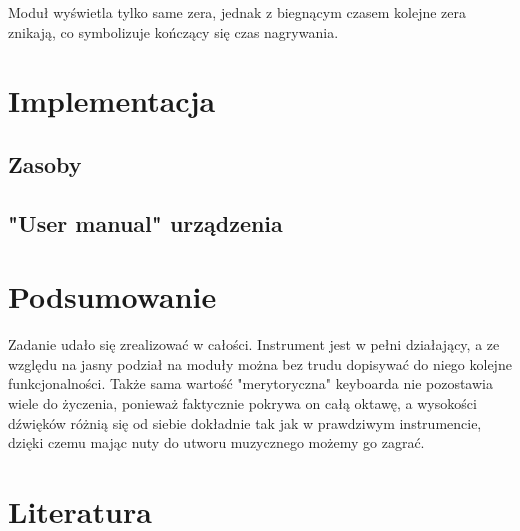 \documentclass[a4paper,11pt]{article}
\begin{document}
Moduł wyświetla tylko same zera, jednak z biegnącym czasem kolejne zera znikają, co symbolizuje kończący się czas nagrywania.

\section{Implementacja}
\subsection{Zasoby}
\subsection{"User manual" urządzenia}

\section{Podsumowanie}
Zadanie udało się zrealizować w całości. Instrument jest w pełni działający, a ze względu na jasny podział na moduły można bez trudu dopisywać do niego kolejne funkcjonalności. Także sama wartość "merytoryczna" keyboarda nie pozostawia wiele do życzenia, ponieważ faktycznie pokrywa on całą oktawę, a wysokości dźwięków różnią się od siebie dokładnie tak jak w prawdziwym instrumencie, dzięki czemu mając nuty do utworu muzycznego możemy go zagrać.

\section{Literatura}
\end{document}
